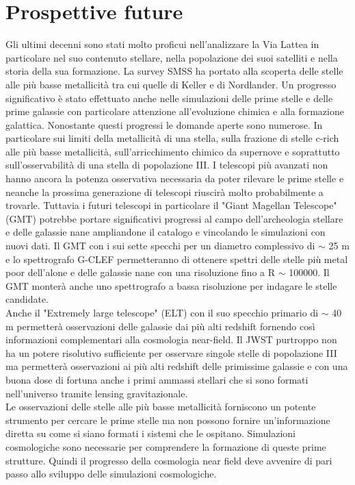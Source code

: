 \documentclass[12pt]{article}
\begin{document}
\newpage









\section{Prospettive future}




Gli ultimi decenni sono stati molto proficui nell’analizzare la Via Lattea in particolare nel suo contenuto stellare, nella popolazione dei suoi satelliti e nella storia della sua formazione. La survey SMSS ha portato alla scoperta delle stelle alle più basse metallicità tra cui quelle di Keller e di Nordlander. 
Un progresso significativo è stato effettuato anche nelle simulazioni delle prime stelle e delle prime galassie con particolare attenzione all’evoluzione chimica e alla formazione galattica. Nonostante questi progressi le domande aperte sono numerose. In particolare sui limiti della metallicità di una stella, sulla frazione di stelle c-rich alle più basse metallicità, sull’arricchimento chimico da supernove e soprattutto sull'osservabilità di una stella di popolazione III. I telescopi più avanzati non hanno ancora la potenza osservativa necessaria da poter rilevare le prime stelle e neanche la prossima generazione di telescopi riuscirà molto probabilmente a trovarle. Tuttavia i futuri telescopi in particolare il "Giant Magellan Telescope" (GMT) potrebbe portare significativi progressi al campo dell’archeologia stellare e delle galassie nane ampliandone il catalogo e vincolando le simulazioni con nuovi dati. Il GMT con i sui sette specchi per un diametro complessivo di $\sim$ 25 m e lo spettrografo G-CLEF permetteranno di ottenere spettri delle stelle più metal poor dell’alone e delle galassie nane con una risoluzione fino a R $\sim$ 100000. Il GMT monterà anche uno spettrografo a bassa risoluzione per indagare le stelle candidate. \\
Anche il "Extremely large telescope" (ELT) con il suo specchio primario di $\sim$ 40 m permetterà osservazioni delle galassie dai più alti redshift fornendo così informazioni complementari alla cosmologia near-field.
Il JWST purtroppo non ha un potere risolutivo sufficiente per osservare singole stelle di popolazione III ma permetterà osservazioni ai più alti redshift delle primissime galassie e con una buona dose di fortuna anche i primi ammassi stellari che si sono formati nell’universo tramite lensing gravitazionale. \\
Le osservazioni delle stelle alle più basse metallicità forniscono un potente strumento per cercare le prime stelle ma non possono fornire un'informazione diretta su come si siano formati i sistemi che le ospitano. Simulazioni cosmologiche sono necessarie per comprendere la formazione di queste prime strutture. Quindi il progresso della cosmologia near field deve avvenire di pari passo allo sviluppo delle simulazioni cosmologiche. 









\newpage
\
\printbibliography
\end{document}
